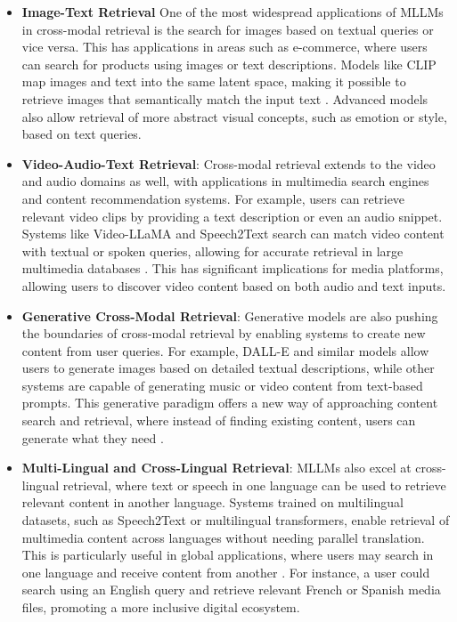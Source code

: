 \begin{itemize}

\item \textbf{Image-Text Retrieval} One of the most widespread applications of MLLMs in cross-modal retrieval is the search for images based on textual queries or vice versa. This has applications in areas such as e-commerce, where users can search for products using images or text descriptions. Models like CLIP map images and text into the same latent space, making it possible to retrieve images that semantically match the input text \cite{vs2024li}. Advanced models also allow retrieval of more abstract visual concepts, such as emotion or style, based on text queries.

\item \textbf{Video-Audio-Text Retrieval}: Cross-modal retrieval extends to the video and audio domains as well, with applications in multimedia search engines and content recommendation systems. For example, users can retrieve relevant video clips by providing a text description or even an audio snippet. Systems like Video-LLaMA and Speech2Text search can match video content with textual or spoken queries, allowing for accurate retrieval in large multimedia databases \cite{vs2014chen,vs2024gomez}. This has significant implications for media platforms, allowing users to discover video content based on both audio and text inputs.

\item \textbf{Generative Cross-Modal Retrieval}: Generative models are also pushing the boundaries of cross-modal retrieval by enabling systems to create new content from user queries. For example, DALL-E and similar models allow users to generate images based on detailed textual descriptions, while other systems are capable of generating music or video content from text-based prompts. This generative paradigm offers a new way of approaching content search and retrieval, where instead of finding existing content, users can generate what they need \cite{yin2023survey,vs2019muller}.

\item \textbf{Multi-Lingual and Cross-Lingual Retrieval}: MLLMs also excel at cross-lingual retrieval, where text or speech in one language can be used to retrieve relevant content in another language. Systems trained on multilingual datasets, such as Speech2Text or multilingual transformers, enable retrieval of multimedia content across languages without needing parallel translation. This is particularly useful in global applications, where users may search in one language and receive content from another \cite{vs2024gomez,vs2024li}. For instance, a user could search using an English query and retrieve relevant French or Spanish media files, promoting a more inclusive digital ecosystem.


\end{itemize}
